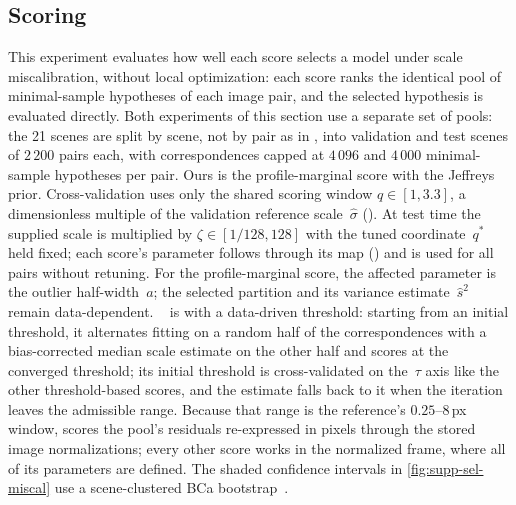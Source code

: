 \subsection{Scoring}
\label{sec:supp-scoring}

This experiment evaluates how well each score selects a model under scale
miscalibration, without local optimization: each score ranks the identical
pool of minimal-sample hypotheses of each image pair, and the selected
hypothesis is evaluated directly. Both experiments of this section use a
separate set of \phototourism pools: the 21 scenes are split by scene, not by
pair as in , into \PTValScenes{} validation and
\PTTestScenes{} test scenes of $2\,200$ pairs each, with \rootsift
correspondences capped at $4\,096$ and $4\,000$ minimal-sample hypotheses per
pair. Ours is the
profile-marginal score with the Jeffreys prior. Cross-validation uses only
the shared scoring window $q\in[1,3.3]$, a dimensionless multiple of the
validation reference scale~$\hat\sigma$ (). At
test time the supplied scale is multiplied by $\zeta\in[1/128,128]$ with the
tuned coordinate~$q^*$ held fixed; each score's parameter follows through
its map () and is used for all pairs without
retuning. For the profile-marginal score, the affected parameter is the
outlier half-width~$a$; the selected partition and its variance
estimate~$\hat s^2$ remain data-dependent. \simfitpp~\cite{Edstedt2025} is
\msac with a data-driven threshold: starting from an initial threshold, it
alternates fitting on a random half of the correspondences with a
bias-corrected median scale estimate on the other half and scores at the
converged threshold; its initial threshold is cross-validated on the~$\tau$
axis like the other threshold-based scores, and the estimate falls back to
it when the iteration leaves the admissible range. Because that range is the
reference's $0.25$--$8$\,px window, \simfitpp scores the pool's residuals
re-expressed in pixels through the stored image normalizations; every other
score works in the normalized frame, where all of its parameters are
defined. The shaded confidence intervals in \cref{fig:supp-sel-miscal} use a
scene-clustered BCa bootstrap~\cite{Efron1987}.

